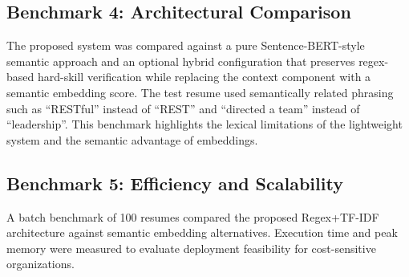 \subsection{Benchmark 4: Architectural Comparison}
The proposed system was compared against a pure Sentence-BERT-style semantic approach and an optional hybrid configuration that preserves regex-based hard-skill verification while replacing the context component with a semantic embedding score. The test resume used semantically related phrasing such as ``RESTful'' instead of ``REST'' and ``directed a team'' instead of ``leadership''. This benchmark highlights the lexical limitations of the lightweight system and the semantic advantage of embeddings.

\subsection{Benchmark 5: Efficiency and Scalability}
A batch benchmark of 100 resumes compared the proposed Regex+TF-IDF architecture against semantic embedding alternatives. Execution time and peak memory were measured to evaluate deployment feasibility for cost-sensitive organizations.
